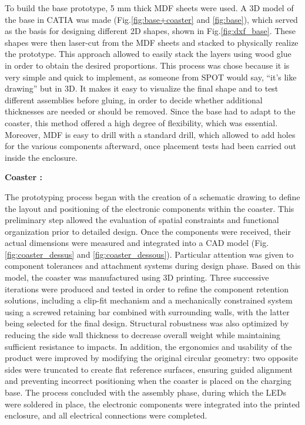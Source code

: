 \documentclass{article}
\begin{document}
To build the base prototype, 5 mm thick MDF sheets were used.
A 3D model of the base in CATIA was made (Fig.\ref{fig:base+coaster} and \ref{fig:base}), which served as the basis for designing different 2D shapes, shown in Fig.\ref{fig:dxf_base}. These shapes were then laser-cut from the MDF sheets and stacked to physically realize the prototype. This approach allowed to easily stack the layers using wood glue in order to obtain the desired proportions. This process was chose because it is very simple and quick to implement, as someone from SPOT would say, “it’s like drawing” but in 3D. It makes it easy to visualize the final shape and to test different assemblies before gluing, in order to decide whether additional thicknesses are needed or should be removed. Since the base had to adapt to the coaster, this method offered a high degree of flexibility, which was essential. Moreover, MDF is easy to drill with a standard drill, which allowed to add holes for the various components afterward, once placement tests had been carried out inside the enclosure.\\\vspace{0.2cm}

\noindent \textbf{Coaster :}\vspace{0.2cm}

The prototyping process began with the creation of a schematic drawing to define the layout and positioning of the electronic components within the coaster. This preliminary step allowed the evaluation of spatial constraints and functional organization prior to detailed design. Once the components were received, their actual dimensions were measured and integrated into a CAD model (Fig.\ref{fig:coaster_dessus} and \ref{fig:coaster_dessous}). Particular attention was given to component tolerances and attachment systems during design phase. Based on this model, the coaster was manufactured using 3D printing. Three successive iterations were produced and tested in order to refine the component retention solutions, including a clip-fit mechanism and a mechanically constrained system using a screwed retaining bar combined with surrounding walls, with the latter being selected for the final design. Structural robustness was also optimized by reducing the side wall thickness to decrease overall weight while maintaining sufficient resistance to impacts. In addition, the ergonomics and usability of the product were improved by modifying the original circular geometry: two opposite sides were truncated to create flat reference surfaces, ensuring guided alignment and preventing incorrect positioning when the coaster is placed on the charging base. The process concluded with the assembly phase, during which the LEDs were soldered in place, the electronic components were integrated into the printed enclosure, and all electrical connections were completed.
\end{document}
